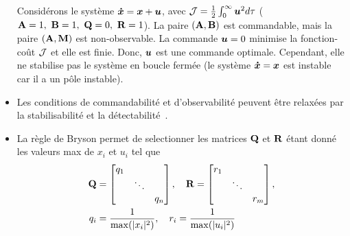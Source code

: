 \begin{itemize}
	\begin{example}
		Considérons le système $\bm{\dot{x}} = \bm{x} +\bm{u}$, avec ${\cal J} = \frac{1}{2}\int_{0}^{\infty}\bm{u}^2d\tau$ ($\matriceA=1, \ \matriceB=1, \ \matriceQ=0, \ \matriceR=1$). La paire $\left(\mathbf{A}, \mathbf{B}\right)$ est commandable, mais la paire $\left(\mathbf{A},\mathbf{M}\right)$ est non-observable. La commande $\bm{u}=0$ minimise la fonction-coût ${\cal J}$ et elle est finie. Donc, $\bm{u}$ est une commande optimale. Cependant, elle ne stabilise pas le système en boucle fermée (le système $\bm{\dot{x}}=\bm{x}$ est instable car il a un pôle instable). 
	\end{example}
	\item Les conditions de commandabilité et d'observabilité peuvent être relaxées par la stabilisabilité et la détectabilité~\cite{gopal2010book}. 
	\item La règle de Bryson permet de selectionner les matrices $\mathbf{Q}$ et $\mathbf{R}$ étant donné les valeurs max de $x_i$ et $u_i$ tel que 
	\begin{align}
		\begin{split}
			\mathbf{Q} &= \begin{bmatrix}
				q_1&&\\
				 &\ddots&\\
				 &&q_n
			\end{bmatrix}, \quad \mathbf{R}=\begin{bmatrix}
			r_1&&\\
			&\ddots&\\
			&&r_m
			\end{bmatrix}, \\
			q_i &= \frac{1}{\max(|x_i|^2)}, \quad r_i = \frac{1}{\max(|u_i|^2)}
		\end{split}
	\end{align}
\end{itemize}

